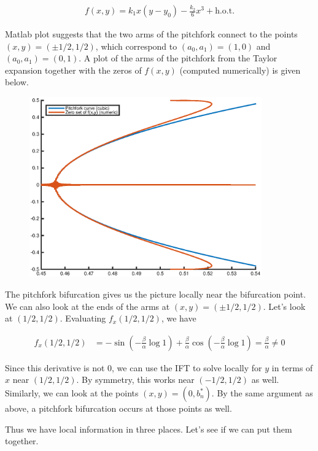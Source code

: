 \documentclass[12pt]{article}
\begin{document}
\begin{enumerate}
\begin{align*}
f(x, y) = k_1 x (y - y_0) - \frac{k_2}{6} x^3 + \text{h.o.t.}
\end{align*}

Matlab plot suggests that the two arms of the pitchfork connect to the points $(x,y) = (\pm 1/2, 1/2)$, which correspond to $(a_0, a_1) = (1, 0)$ and $(a_0, a_1) = (0, 1)$. A plot of the arms of the pitchfork from the Taylor expansion together with the zeros of $f(x,y)$ (computed numerically) is given below.

\begin{figure}[H]
\includegraphics[width=10cm]{pitchfork.eps}
\end{figure}

The pitchfork bifurcation gives us the picture locally near the bifurcation point. We can also look at the ends of the arms at $(x,y) = (\pm 1/2, 1/2)$. Let's look at $(1/2, 1/2)$. Evaluating $f_x(1/2, 1/2)$, we have

\begin{align*}
f_x(1/2, 1/2) &= -\sin \left( - \frac{\beta}{\alpha} \log 1 \right) + \frac{\beta}{\alpha} \cos \left( - \frac{\beta}{\alpha} \log 1 \right)= \frac{\beta}{\alpha} \neq 0
\end{align*}

Since this derivative is not 0, we can use the IFT to solve locally for $y$ in terms of $x$ near $(1/2, 1/2)$. By symmetry, this works near $(-1/2, 1/2)$ as well. \\

Similarly, we can look at the points $(x, y) = (0, b^*_n)$. By the same argument as above, a pitchfork bifurcation occurs at those points as well. 

Thus we have local information in three places. Let's see if we can put them together.\\


\end{enumerate}
\end{document}
